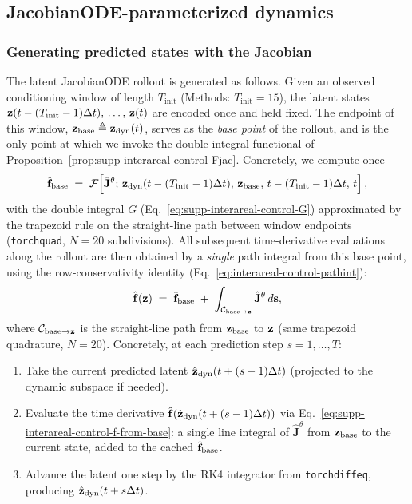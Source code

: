 \subsection{JacobianODE-parameterized dynamics}\label{supp:interareal-control-JODE-dyn}

\subsubsection{Generating predicted states with the Jacobian}\label{supp:interareal-control-gen-pred}

The latent JacobianODE rollout is generated as follows. Given an observed conditioning window of length $T_{\mathrm{init}}$ (Methods: $T_{\mathrm{init}}=15$), the latent states $\vb{z}(t-(T_{\mathrm{init}}-1)\Delta t),\,\ldots,\,\vb{z}(t)$ are encoded once and held fixed. The endpoint of this window, $\vb{z}_{\mathrm{base}}\triangleq\vb{z}_{\mathrm{dyn}}(t)$, serves as the \emph{base point} of the rollout, and is the only point at which we invoke the double-integral functional of Proposition~\ref{prop:supp-interareal-control-Fjac}. Concretely, we compute once
\begin{equation}
\hat{\vb{f}}_{\mathrm{base}} \;=\; \mathcal{F}\!\left[\hat{\mathbf{J}}^{\theta};\,\vb{z}_{\mathrm{dyn}}(t-(T_{\mathrm{init}}-1)\Delta t),\,\vb{z}_{\mathrm{base}},\,t-(T_{\mathrm{init}}-1)\Delta t,\,t\right],
\label{eq:supp-interareal-control-fbase}
\end{equation}
with the double integral $G$ (Eq.~\ref{eq:supp-interareal-control-G}) approximated by the trapezoid rule on the straight-line path between window endpoints (\texttt{torchquad}, $N=20$ subdivisions). All subsequent time-derivative evaluations along the rollout are then obtained by a \emph{single} path integral from this base point, using the row-conservativity identity (Eq.~\ref{eq:interareal-control-pathint}):
\begin{equation}
\hat{\vb{f}}(\vb{z}) \;=\; \hat{\vb{f}}_{\mathrm{base}} \;+\; \int_{\mathcal{C}_{\mathrm{base}\to\vb{z}}}\hat{\mathbf{J}}^{\theta}\,d\vb{s},
\label{eq:supp-interareal-control-f-from-base}
\end{equation}
where $\mathcal{C}_{\mathrm{base}\to\vb{z}}$ is the straight-line path from $\vb{z}_{\mathrm{base}}$ to $\vb{z}$ (same trapezoid quadrature, $N=20$). Concretely, at each prediction step $s=1,\ldots,T$:
\begin{enumerate}
\item Take the current predicted latent $\hat{\vb{z}}_{\mathrm{dyn}}(t+(s-1)\Delta t)$ (projected to the dynamic subspace if needed).
\item Evaluate the time derivative $\hat{\vb{f}}(\hat{\vb{z}}_{\mathrm{dyn}}(t+(s-1)\Delta t))$ via Eq.~\ref{eq:supp-interareal-control-f-from-base}: a single line integral of $\hat{\mathbf{J}}^{\theta}$ from $\vb{z}_{\mathrm{base}}$ to the current state, added to the cached $\hat{\vb{f}}_{\mathrm{base}}$.
\item Advance the latent one step by the RK4 integrator from \texttt{torchdiffeq}, producing $\hat{\vb{z}}_{\mathrm{dyn}}(t+s\Delta t)$.
\end{enumerate}
